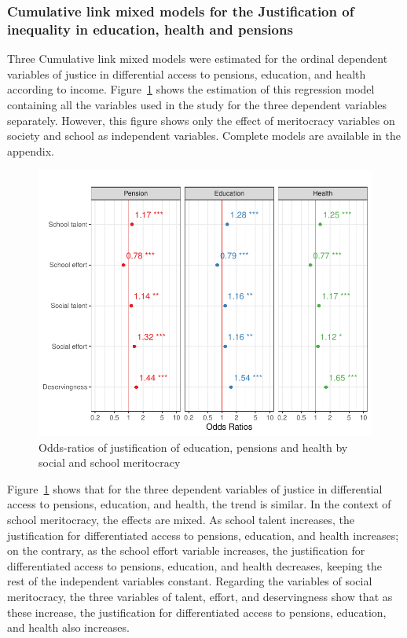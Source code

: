 \documentclass[
  letterpaper,
  DIV=11,
  numbers=noendperiod]{scrartcl}
\begin{document}
\hypertarget{cumulative-link-mixed-models-for-the-justification-of-inequality-in-education-health-and-pensions}{%
\subsubsection{Cumulative link mixed models for the Justification of
inequality in education, health and
pensions}\label{cumulative-link-mixed-models-for-the-justification-of-inequality-in-education-health-and-pensions}}

Three Cumulative link mixed models were estimated for the ordinal
dependent variables of justice in differential access to pensions,
education, and health according to income. Figure~\ref{fig-odds} shows
the estimation of this regression model containing all the variables
used in the study for the three dependent variables separately. However,
this figure shows only the effect of meritocracy variables on society
and school as independent variables. Complete models are available in
the appendix.

\begin{figure}

{\centering \includegraphics{paper_files/figure-pdf/fig-odds-1.pdf}

}

\caption{\label{fig-odds}Odds-ratios of justification of education,
pensions and health by social and school meritocracy}

\end{figure}

Figure~\ref{fig-odds} shows that for the three dependent variables of
justice in differential access to pensions, education, and health, the
trend is similar. In the context of school meritocracy, the effects are
mixed. As school talent increases, the justification for differentiated
access to pensions, education, and health increases; on the contrary, as
the school effort variable increases, the justification for
differentiated access to pensions, education, and health decreases,
keeping the rest of the independent variables constant. Regarding the
variables of social meritocracy, the three variables of talent, effort,
and deservingness show that as these increase, the justification for
differentiated access to pensions, education, and health also increases.
\end{document}

